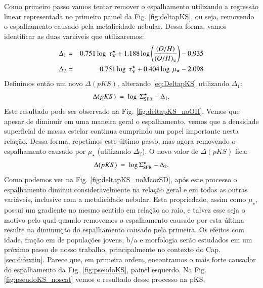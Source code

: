 Como primeiro passo vamos tentar remover o espalhamento utilizando a regressão linear representada
no primeiro painel da Fig. \ref{fig:deltapKS}, ou seja, removendo o espalhamento causado pela
metalicidade nebular. Dessa forma, vamos identificar as duas variáveis que utilizaremos:
\begin{eqnarray}
	\Delta_1 &=& 0.751 \log\ \tau_{\mathrm{V}}^\star + 1.188 \log \left(\frac{(O/H)}{(O/H)_\odot}\right) - 0.935 \\
	\label{eq:Delta1}
	\Delta_2 &=& 0.751 \log\ \tau_{\mathrm{V}}^\star + 0.404 \log\ \mu_\star - 2.098 \\
	\label{eq:Delta2}
\end{eqnarray}
Definimos então um novo $\Delta(pKS)$, alterando \eqref{eq:DeltapKS} utilizando $\Delta_1$:
\begin{equation}
	\Delta(pKS)\ =\ \log\ \Sigma_{\mathrm{SFR}}^\star - \Delta_1.
\end{equation}
\noindent Este resultado pode ser observado na Fig. \ref{fig:deltapKS_noOH}. Vemos que apesar
de diminuir em uma maneira geral o espalhamento, vemos que a densidade superficial de massa estelar
continua cumprindo um papel importante nesta relação. Dessa forma, repetimos este último passo, mas
agora removendo o espalhamento causado por $\mu_\star$ (utilizando $\Delta_2$). O novo valor de
$\Delta(pKS)$ fica:
\begin{equation}
	\Delta(pKS)\ =\ \log \Sigma_{\mathrm{SFR}}^\star - \Delta_2.
\end{equation}
\noindent Como podemos ver na Fig. \ref{fig:deltapKS_noMcorSD}, após este processo o
espalhamento diminui consideravelmente na relação geral e em todas as outras variáveis, inclusive
com a metalicidade nebular. Esta propriedade, assim como $\mu_\star$, possui um gradiente no mesmo
sentido em relação ao raio, e talvez esse seja o motivo pelo qual quando removemos o espalhamento
causado por esta última resulte na diminuição do espalhamento causado pela primeira. Os efeitos com
idade, fração em de populações jovens, b/a e morfologia serão estudados em um próximo passo de
nosso trabalho, principalmente no contexto do Cap. \ref{sec:difextin}. Parece que, em primeira
ordem, encontramos o mais forte causador do espalhamento da Fig. \ref{fig:pseudoKS}, painel
esquerdo. Na Fig. \ref{fig:pseudoKS_noscat} vemos o resultado desse processo na pKS.

